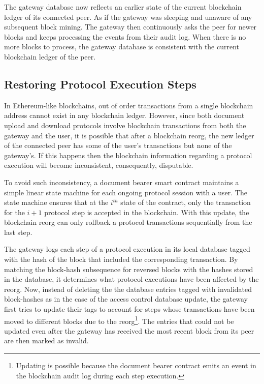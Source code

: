 The gateway database now reflects an earlier state of the current blockchain ledger of its connected peer. As if the gateway was sleeping and unaware of any subsequent block mining. The gateway then continuously asks the peer for newer blocks and keeps processing the events from their audit log. When there is no more blocks to process, the gateway database is consistent with the current blockchain ledger of the peer.

\subsection{Restoring Protocol Execution Steps}
In Ethereum-like blockchains,  out of order transactions from a single blockchain address cannot exist in any blockchain ledger. However, since both document upload and download protocols involve blockchain transactions from both the gateway and the user, it is possible that after a blockchain reorg, the new ledger of the connected peer has some of the user's transactions but none of the gateway's. If this happens then the blockchain information regarding a protocol execution will become inconsistent, consequently, disputable.

To avoid such inconsistency, a document bearer smart contract maintains a simple linear state machine for each ongoing protocol session with a user. The state machine ensures that at the $i^{th}$ state of the contract, only the transaction for the $i+1$ protocol step is accepted in the blockchain. With this update, the blockchain reorg can only rollback a protocol transactions sequentially from the last step.

The gateway logs each step of a protocol execution in its local database tagged with the hash of the block that included the corresponding transaction. By matching the block-hash subsequence for reversed blocks with the hashes stored in the database, it determines what protocol executions have been affected by the reorg. Now, instead of deleting the the database entries tagged with invalidated block-hashes as in the case of the access control database update, the gateway first tries to update their tags to account for steps whose transactions have been moved to different blocks due to the reorg\footnote{Updating is possible because the document bearer contract emits an event in the blockchain audit log during each step execution.}. The entries that could not be updated even after the gateway has received the most recent block from its peer are then marked as invalid.

